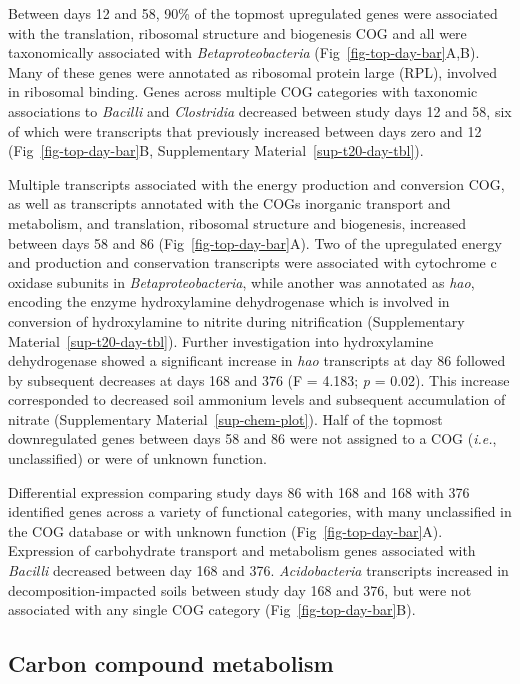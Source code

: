 \documentclass[
  sn-nature,
  lineno, referee]{sn-jnl}
\begin{document}
Between days 12 and 58, 90\% of the topmost upregulated genes were
associated with the translation, ribosomal structure and biogenesis COG
and all were taxonomically associated with \emph{Betaproteobacteria}
(Fig~\ref{fig-top-day-bar}A,B). Many of these genes were annotated as
ribosomal protein large (RPL), involved in ribosomal binding. Genes
across multiple COG categories with taxonomic associations to
\emph{Bacilli} and \emph{Clostridia} decreased between study days 12 and
58, six of which were transcripts that previously increased between days
zero and 12 (Fig~\ref{fig-top-day-bar}B,
Supplementary Material~\ref{sup-t20-day-tbl}).

Multiple transcripts associated with the energy production and
conversion COG, as well as transcripts annotated with the COGs inorganic
transport and metabolism, and translation, ribosomal structure and
biogenesis, increased between days 58 and 86
(Fig~\ref{fig-top-day-bar}A). Two of the upregulated energy and
production and conservation transcripts were associated with cytochrome
c oxidase subunits in \emph{Betaproteobacteria}, while another was
annotated as \emph{hao}, encoding the enzyme hydroxylamine dehydrogenase
which is involved in conversion of hydroxylamine to nitrite during
nitrification (Supplementary Material~\ref{sup-t20-day-tbl}). Further
investigation into hydroxylamine dehydrogenase showed a significant
increase in \emph{hao} transcripts at day 86 followed by subsequent
decreases at days 168 and 376 (F = 4.183; \emph{p} = 0.02). This
increase corresponded to decreased soil ammonium levels and subsequent
accumulation of nitrate (Supplementary Material~\ref{sup-chem-plot}).
Half of the topmost downregulated genes between days 58 and 86 were not
assigned to a COG (\emph{i.e.}, unclassified) or were of unknown
function.

Differential expression comparing study days 86 with 168 and 168 with
376 identified genes across a variety of functional categories, with
many unclassified in the COG database or with unknown function
(Fig~\ref{fig-top-day-bar}A). Expression of carbohydrate transport and
metabolism genes associated with \emph{Bacilli} decreased between day
168 and 376. \emph{Acidobacteria} transcripts increased in
decomposition-impacted soils between study day 168 and 376, but were not
associated with any single COG category (Fig~\ref{fig-top-day-bar}B).

\subsection{Carbon compound
metabolism}\label{carbon-compound-metabolism}
\end{document}
